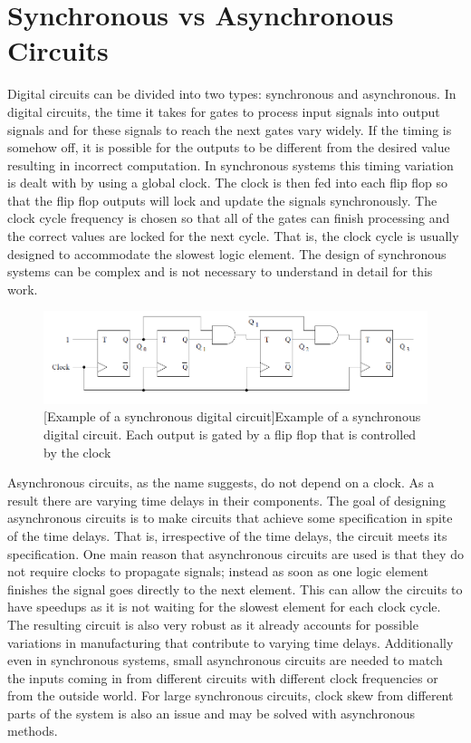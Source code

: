 \documentclass[12pt]{report}
\begin{document}
\section{Synchronous vs Asynchronous Circuits}
Digital circuits can be divided into two types: synchronous and asynchronous.  In digital circuits, the time it takes for gates to process input signals into output signals and for these signals to reach the next gates vary widely.  If the timing is somehow off, it is possible for the outputs to be different from the desired value resulting in incorrect computation. In synchronous systems this timing variation is dealt with by using a global clock.  The clock is then fed into each flip flop so that the flip flop outputs will lock and update the signals synchronously. The clock cycle frequency is chosen so that all of the gates can finish processing and the correct values are locked for the next cycle. That is, the clock cycle is usually designed to accommodate the slowest logic element. The design of synchronous systems can be complex and is not necessary to understand in detail for this work. \\
\begin{figure}
\includegraphics[width=\textwidth]{syncex}
[Example of a synchronous digital circuit]{Example of a synchronous digital circuit.  Each output is gated by a flip flop that is controlled by the clock}
\end{figure}

Asynchronous circuits, as the name suggests, do not depend on a clock. As a result there are varying time delays in their components. The goal of designing asynchronous circuits is to make circuits that achieve some specification in spite of the time delays. That is, irrespective of the time delays, the circuit meets its specification. One main reason that asynchronous circuits are used is that they do not require clocks to propagate signals; instead as soon as one logic element finishes the signal goes directly to the next element.  This can allow the circuits to have speedups as it is not waiting for the slowest element for each clock cycle.  The resulting circuit is also very robust as it already accounts for possible variations in manufacturing that contribute to varying time delays.  Additionally even in synchronous systems, small asynchronous circuits are needed to match the inputs coming in from different circuits with different clock frequencies or from the outside world.  For large synchronous circuits, clock skew from different parts of the system is also an issue and may be solved with asynchronous methods. \\ %
\end{document}
